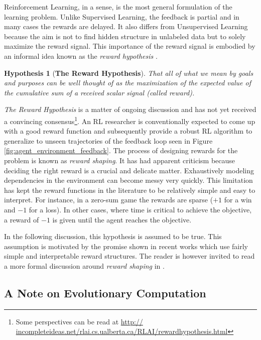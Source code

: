 \documentclass[12pt,a4paper]{article}
\newtheorem{hypothesis}{Hypothesis}
\begin{document}
Reinforcement Learning, in a sense, is the most general formulation of the learning problem. 
Unlike Supervised Learning, the feedback is partial and in many cases the rewards are delayed.
It also differs from Unsupervised Learning because the aim is not to find hidden structure in
unlabeled data but to solely maximize the reward signal. This importance of the reward signal
is embodied by an informal idea known as the \textit{reward hypothesis} \cite{Sutton:1998:IRL:551283}.

\begin{hypothesis}[\textbf{The Reward Hypothesis}] \label{hypothesis:reward}
That all of what we mean by goals and purposes can be well thought of as the maximization of 
the expected value of the cumulative sum of a received scalar signal (called reward).
\end{hypothesis}

\textit{The Reward Hypothesis} is a matter of ongoing discussion and has not yet received a
convincing consensus{\footnote{Some perspectives can be read at \url{http://
incompleteideas.net/rlai.cs.ualberta.ca/RLAI/rewardhypothesis.html}}}. An RL researcher is 
conventionally expected to come up with a good reward function and subsequently provide a 
robust RL algorithm to generalize to unseen trajectories of the feedback loop seen in Figure 
\ref{fig:agent_environment_feedback}. The process of designing rewards for the problem is 
known as \textit{reward shaping}. It has had apparent criticism because deciding the right
reward is a crucial and delicate matter. Exhaustively modeling dependencies in the environment
can become messy very quickly. This limitation has kept the reward functions in the literature to
be relatively simple and easy to interpret. For instance, in a zero-sum game the rewards are
sparse ($+1$ for a win and $-1$ for a loss). In other cases, where time is critical to achieve the
objective, a reward of $-1$ is given until the agent reaches the objective.

In the following discussion, this hypothesis is assumed to be true. This assumption is motivated
by the promise shown in recent works which use fairly simple and interpretable reward
structures. The reader is however invited to read a more formal discussion around \textit{reward
shaping} in \cite{Ng:1999:PIU:645528.657613}.

\subsection{A Note on Evolutionary Computation}
\end{document}
